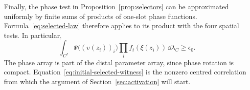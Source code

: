 Finally, the phase test in Proposition~\ref{prop:selectors} can be
approximated uniformly by finite sums of products of one-slot phase
functions.  Formula~\eqref{eq:selected-law} therefore applies to its
product with the four spatial tests.  In particular,
\begin{equation}\label{eq:initial-selected-witness}
 \int_{C^I}\Psi\bigl((\upsilon(z_i))_i\bigr)
       \prod_i f_i(\xi(z_i))\,\dd\lambda_C\ge\epsilon_0.
\end{equation}
The phase array is part of the distal parameter array, since phase
rotation is compact.  Equation~\eqref{eq:initial-selected-witness}
is the nonzero centred correlation from which the argument of
Section~\ref{sec:activation} will start.
